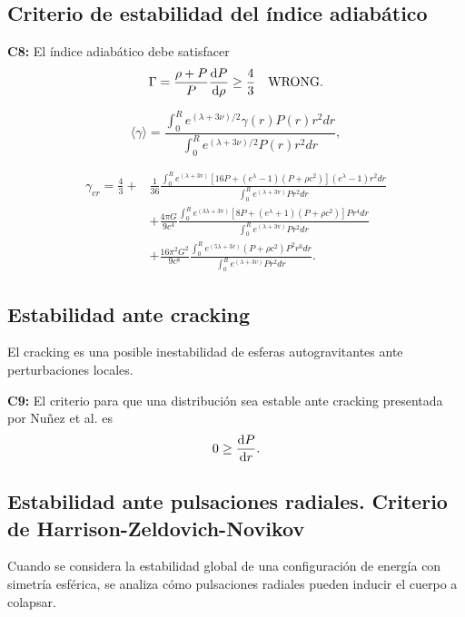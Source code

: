\subsection*{Criterio de estabilidad del índice adiabático }

\textbf{C8:} El índice adiabático debe satisfacer
\begin{equation}
    \Gamma = \frac { \rho + P  } { P } \dv{P}{\rho} \geq \frac{4}{3} \quad \text{WRONG}.
\end{equation}

\begin{equation}
     \langle\gamma\rangle=\frac{\int_{0}^{R} e^{(\lambda+3 \nu) / 2} \gamma(r) P(r) r^{2} d r}{\int_{0}^{R} e^{(\lambda+3 \nu) / 2} P(r) r^{2} d r},
\end{equation}

\begin{align}
    \gamma_{cr} = \frac{4}{3} +& \frac{1}{36} \frac{\int_{0}^{R} e^{(\lambda+3 \mathrm{v})}\left[16 P+\left(e^{\lambda}-1\right)\left(P+\rho c^{2}\right)\right]\left(e^{\lambda}-1\right) r^{2} d r}{\int_{0}^{R} e^{(\lambda+3 \mathrm{v}) } P r^{2} d r} \nonumber
    \\ &+ \frac{4 \pi G}{9 c^{4}} \frac{\int_{0}^{R} e^{(3 \lambda+3 \mathrm{v})}\left[8 P+\left(e^{\lambda}+1\right)\left(P+\rho c^{2}\right)\right] P r^{4} d r}{\int_{0}^{R} e^{(\lambda+3 \mathrm{v})} P r^{2} d r}
    \\ & + \frac{16 \pi^{2} G^{2}}{9 c^{8}} \frac{\int_{0}^{R} e^{(5 \lambda+3 v) }\left(P+\rho c^{2}\right) P^{2} r^{6} d r}{\int_{0}^{R} e^{(\lambda+3 v) } P r^{2} d r}. \nonumber
\end{align}
\subsection*{Estabilidad ante cracking}
El cracking es una posible inestabilidad de esferas autogravitantes ante perturbaciones locales.

\textbf{C9:} El criterio para que una distribución sea estable ante cracking presentada por Nuñez et al. \cite{Gonzalez2014CrackingSpheres} es
\begin{equation}
    0 \geq \dv{P}{r}.
\end{equation}

\subsection*{Estabilidad ante pulsaciones radiales. Criterio de Harrison-Zeldovich-Novikov}
Cuando se considera la estabilidad global de una configuraci\'on de energía con simetría esférica, se analiza cómo pulsaciones radiales pueden inducir el cuerpo a colapsar. 

